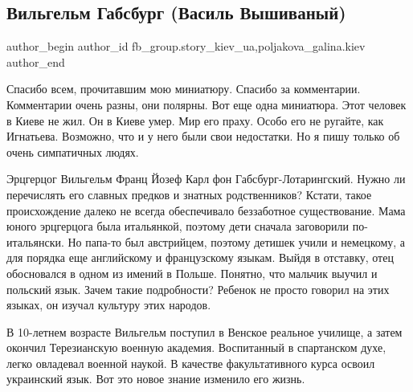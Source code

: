  
 
 
 
 
 
\subsection{Вильгельм Габсбург (Василь Вышиваный)}
\label{sec:21_12_2021.fb.fb_group.story_kiev_ua.1.vasyl_vyshyvanyj}
 
\ifcmt
 author_begin
   author_id fb_group.story_kiev_ua,poljakova_galina.kiev
 author_end
\fi

Спасибо всем, прочитавшим мою миниатюру. Спасибо за комментарии. Комментарии
очень разны, они полярны. Вот еще одна миниатюра. Этот человек в Киеве не жил.
Он в Киеве умер. Мир его праху. Особо его не ругайте, как Игнатьева. Возможно,
что и у него были свои недостатки. Но я пишу только об очень симпатичных людях. 


Эрцгерцог Вильгельм Франц Йозеф Карл фон Габсбург\hyp Лотарингский. Нужно ли
перечислять его славных предков и знатных родственников? Кстати, такое
происхождение далеко не всегда обеспечивало беззаботное существование. Мама
юного эрцгерцога была итальянкой, поэтому дети сначала заговорили
по-итальянски. Но папа-то был австрийцем, поэтому детишек учили и немецкому, а
для порядка еще английскому и французскому языкам. Выйдя в отставку, отец
обосновался в одном из имений в Польше. Понятно, что мальчик выучил и польский
язык. Зачем такие подробности? Ребенок не просто говорил на этих языках, он
изучал культуру этих народов. 

В 10-летнем возрасте Вильгельм поступил в Венское реальное училище, а затем
окончил Терезианскую военную академия. Воспитанный в спартанском духе, легко
овладевал военной наукой. В качестве факультативного курса освоил украинский
язык. Вот это новое знание изменило его жизнь. 


